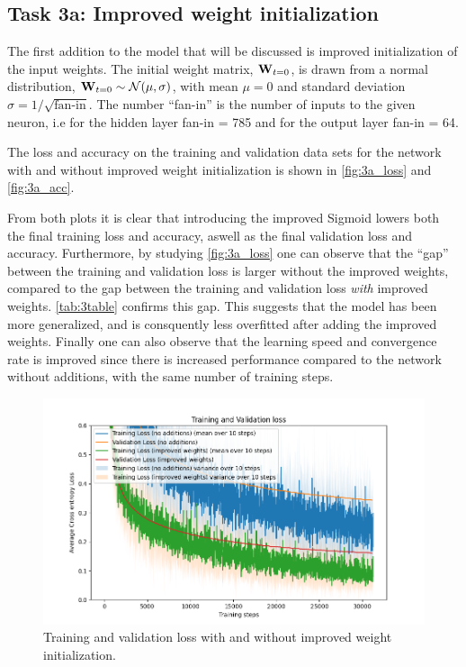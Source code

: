 \documentclass{article}
\begin{document}
\subsection{Task 3a: Improved weight initialization}
The first addition to the model that will be discussed is improved initialization of the input weights. The initial weight matrix, $\text{\textbf{W}}_{t=0}$, is drawn from a normal distribution, $\text{\textbf{W}}_{t=0} \sim \mathcal{N}(\mu,\sigma)$, with mean $\mu = 0$ and standard deviation $\sigma = 1/\sqrt{\text{fan-in}}$. The number ``fan-in'' is the number of inputs to the given neuron, i.e for the hidden layer fan-in = 785 and for the output layer fan-in = 64.

The loss and accuracy on the training and validation data sets for the network with and without improved weight initialization is shown in \autoref{fig:3a_loss} and \autoref{fig:3a_acc}. 

From both plots it is clear that introducing the improved Sigmoid lowers both the final training loss and accuracy, aswell as the final validation loss and accuracy. Furthermore, by studying \autoref{fig:3a_loss} one can observe that the ``gap'' between the training and validation loss is larger without the improved weights, compared to the gap between the training and validation loss \textit{with} improved weights. \autoref{tab:3table} confirms this gap. This suggests that the model has been more generalized, and is consquently less overfitted after adding the improved weights. Finally one can also observe that the learning speed and convergence rate is improved since there is increased performance compared to the network without additions, with the same number of training steps.

\begin{figure}[H]
    \centering
    \includegraphics[width=\textwidth]{Assignments/Assignment_2/plots/task3/3a_loss.png}
    \caption{Training and validation loss with and without improved weight initialization.}
    \label{fig:3a_loss}
\end{figure}
\end{document}
